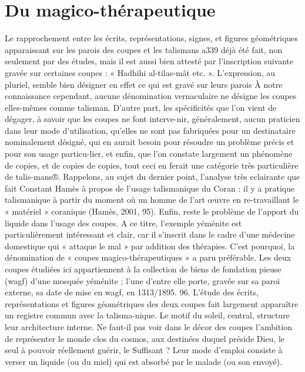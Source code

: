 \section{Du magico-thérapeutique}
Le rapprochement entre les écrits, représentations, signes, et figures géométriques apparaissant sur les parois des coupes et les talismans a339
déjà été fait, non seulement par des études, mais il est aussi bien attesté par l'inscription suivante gravée sur certaines coupes : « Hadhihi al-tilas-mât etc. ». L'expression, au pluriel, semble bien désigner en effet ce qui est gravé sur leurs parois%
À notre connaissance cependant, aucune dénomination vernaculaire ne désigne les coupes elles-mêmes comme talisman. D'autre part, les spécificités que l'on vient de dégager, à savoir que les coupes ne font interve-nir, généralement, aucun praticien dans leur mode d'utilisation, qu'elles ne sont pas fabriquées pour un destinataire nominalement désigné, qui en aurait besoin pour résoudre un problème précis et pour son usage particu-lier, et enfin, que l'on constate largement un phénomène de copies, et de copies de copies, tout ceci en ferait une catégorie très particulière de talis-mans®. Rappelons, au sujet du dernier point, l'analyse très eclairante que fait Constant Hamès à propos de l'usage talismanique du Coran : il y a pratique talismanique à partir du moment où un homme de l'art œuvre en re-travaillant le « matériel » coranique (Hamès, 2001, 95).
Enfin, reste le problème de l'apport du liquide dans l'usage des coupes. A ce titre, l'exemple yéménite est particulièrement intéressant et clair, car il s'inscrit dans le cadre d'une médecine domestique qui « attaque le mal » par addition des thérapies. C'est pourquoi, la dénomination de « coupes magico-thérapeutiques » a paru préférable. 
Les deux coupes étudiées ici appartiennent à la collection de biens de fondation pieuse (wagf) d'une mosquée yéménite ; l'une d'entre elle porte, gravée sur sa paroi externe, sa date de mise en wagf, en 1313/1895.
96. L'étude des écrits, représentations et figures géométriques des deux coupes fait largement apparaître un registre commun avec la talisma-nique. Le motif du soleil, central, structure leur architecture interne. Ne faut-il pas voir dans le décor des coupes l'ambition de représenter le monde clos du cosmos, aux destinées duquel préside Dieu, le seul à pouvoir réellement guérir, le Suffisant ? Leur mode d'emploi consiste à verser un liquide (ou du miel) qui est absorbé par le malade (ou son envoyé).
